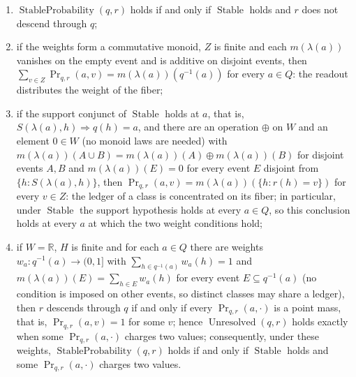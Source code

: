\begin{theorem}
\begin{enumerate}[label=(\roman*)]
  event \(\{h:q(h)=a\ \text{and}\ r(h)=v\}\) is the fiber \(q^{-1}(a)\) when
  \(v=\bar r(a)\) and is empty otherwise, so
  \(\operatorname{Pr}_{q,r}(a,v)=m(\lambda(a))(q^{-1}(a))\) for
  \(v=\bar r(a)\) and \(\operatorname{Pr}_{q,r}(a,v)=m(\lambda(a))(\emptyset)\)
  for \(v\ne\bar r(a)\);
\item \(\operatorname{StableProbability}(q,r)\) holds if and only if
  \(\operatorname{Stable}\) holds and \(r\) does not descend through \(q\);
\item if the weights form a commutative monoid, \(Z\) is finite and each
  \(m(\lambda(a))\) vanishes on the empty event and is additive on disjoint
  events, then
  \(\sum_{v\in Z}\operatorname{Pr}_{q,r}(a,v)=m(\lambda(a))(q^{-1}(a))\) for
  every \(a\in Q\): the readout distributes the weight of the fiber;
\item if the support conjunct of \(\operatorname{Stable}\) holds at \(a\), that
  is, \(S(\lambda(a),h)\Rightarrow q(h)=a\), and there are an operation \(\oplus\) on \(W\) and
  an element \(0\in W\) (no monoid laws are needed) with
  \(m(\lambda(a))(A\cup B)=m(\lambda(a))(A)\oplus m(\lambda(a))(B)\) for disjoint
  events \(A,B\) and \(m(\lambda(a))(E)=0\) for every event \(E\) disjoint from
  \(\{h:S(\lambda(a),h)\}\), then
  \(\operatorname{Pr}_{q,r}(a,v)=m(\lambda(a))(\{h:r(h)=v\})\) for every
  \(v\in Z\): the ledger of a class is concentrated on its fiber; in
  particular, under \(\operatorname{Stable}\) the support hypothesis holds at
  every \(a\in Q\), so this conclusion holds at every \(a\) at which the two
  weight conditions hold;
\item if \(W=\mathbb R\), \(H\) is finite and for each \(a\in Q\) there are weights
  \(w_a:q^{-1}(a)\to(0,1]\) with \(\sum_{h\in q^{-1}(a)}w_a(h)=1\) and
  \(m(\lambda(a))(E)=\sum_{h\in E}w_a(h)\) for every event \(E\subseteq q^{-1}(a)\)
  (no condition is imposed on other events, so distinct classes may share a
  ledger), then \(r\) descends through \(q\) if and only if every
  \(\operatorname{Pr}_{q,r}(a,\cdot)\) is a point mass, that is,
  \(\operatorname{Pr}_{q,r}(a,v)=1\) for some \(v\); hence
  \(\operatorname{Unresolved}(q,r)\) holds exactly when some
  \(\operatorname{Pr}_{q,r}(a,\cdot)\) charges two values; consequently,
  under these weights, \(\operatorname{StableProbability}(q,r)\) holds if and
  only if \(\operatorname{Stable}\) holds and some
  \(\operatorname{Pr}_{q,r}(a,\cdot)\) charges two values.
\end{enumerate}
\end{theorem}
